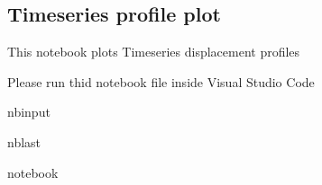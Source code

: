 \documentclass[letterpaper,10pt]{sphinxmanual}
\begin{document}
\sphinxstepscope


\subsection{Time\sphinxhyphen{}series profile plot}
\label{\detokenize{notebooks/akhdefo_ts_plot:Time-series-profile-plot}}\label{\detokenize{notebooks/akhdefo_ts_plot::doc}}
\sphinxAtStartPar
This notebook plots Time\sphinxhyphen{}series displacement profiles

\sphinxAtStartPar
{}

\sphinxAtStartPar
Please run thid notebook file inside Visual Studio Code

\begin{sphinxuseclass}{nbinput}
\begin{sphinxuseclass}{nblast}
{
\begin{sphinxVerbatim}[commandchars=\\\{\}]
\llap{\color{nbsphinxin}[3]:\,\hspace{\fboxrule}\hspace{\fboxsep}} notebook
    

\end{sphinxVerbatim}
}

\end{sphinxuseclass}
\end{sphinxuseclass}
\end{document}
